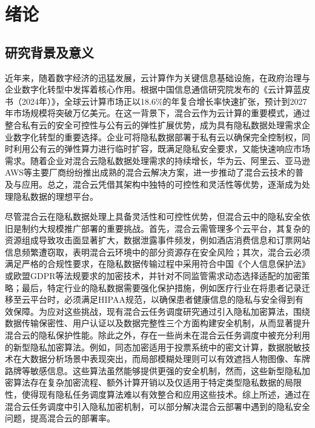 \chapter{绪论}\label{chapter:intro}

\section{研究背景及意义}

近年来，随着数字经济的迅猛发展，云计算作为关键信息基础设施，在政府治理与企业数字化转型中发挥着核心作用。根据中国信息通信研究院发布的《云计算蓝皮书（2024年）》，全球云计算市场正以18.6\%的年复合增长率快速扩张，预计到2027年市场规模将突破万亿美元\cite{ZhongGuoXinXiTongXinYanJiuYuanYunjisuanlanpishu2024nian2024}。在这一背景下，混合云作为云计算的重要模式，通过整合私有云的安全可控性与公有云的弹性扩展优势，成为具有隐私数据处理需求企业数字化转型的重要选择。企业可将隐私数据部署于私有云以确保完全控制权，同时利用公有云的弹性算力进行临时扩容，既满足隐私安全要求，又能快速响应市场需求。随着企业对混合云隐私数据处理需求的持续增长，华为云、阿里云、亚马逊AWS等主要厂商纷纷推出成熟的混合云解决方案，进一步推动了混合云技术的普及与应用。总之，混合云凭借其架构中独特的可控性和灵活性等优势，逐渐成为处理隐私数据的理想平台。

尽管混合云在隐私数据处理上具备灵活性和可控性优势，但混合云中的隐私安全依旧是制约大规模推广部署的重要挑战。首先，混合云需管理多个云平台，其复杂的资源组成导致攻击面显著扩大，数据泄露事件频发，例如酒店消费信息和订票网站信息频繁遭窃取，表明混合云环境中的部分资源存在安全风险；其次，混合云必须满足严格的合规性要求，在隐私数据传输过程中采用符合中国《个人信息保护法》或欧盟GDPR等法规要求的加密技术，并针对不同监管需求动态选择适配的加密策略；最后，特定行业的隐私数据需要强化保护措施，例如医疗行业在将患者记录迁移至云平台时，必须满足HIPAA规范，以确保患者健康信息的隐私与安全得到有效保障。为应对这些挑战，现有混合云任务调度研究通过引入隐私加密算法，围绕数据传输保密性、用户认证以及数据完整性三个方面构建安全机制，从而显著提升混合云的隐私保护性能\cite{leiPrivacySecurityawareWorkflow2022, wangSecurityawareTaskScheduling2021, chenSchedulingWorkflowsSecuritySensitive2017, budatiSecureMultiLevelPrivacyProtection2023, sonPrivacyProtectionBased2020, balJointResourceAllocation2022}。除此之外，存在一些尚未在混合云任务调度中被充分利用的新型隐私加密算法。例如，同态加密适用于投票系统中的密文计算，数据脱敏技术在大数据分析场景中表现突出，而局部模糊处理则可以有效遮挡人物图像、车牌路牌等敏感信息。这些算法虽然能够提供更强的安全机制，然而，这些新型隐私加密算法存在复杂加密流程、额外计算开销以及仅适用于特定类型隐私数据的局限性，使得现有隐私任务调度算法难以有效整合和应用这些技术。综上所述，通过在混合云任务调度中引入隐私加密机制，可以部分解决混合云部署中遇到的隐私安全问题，提高混合云的部署率。

